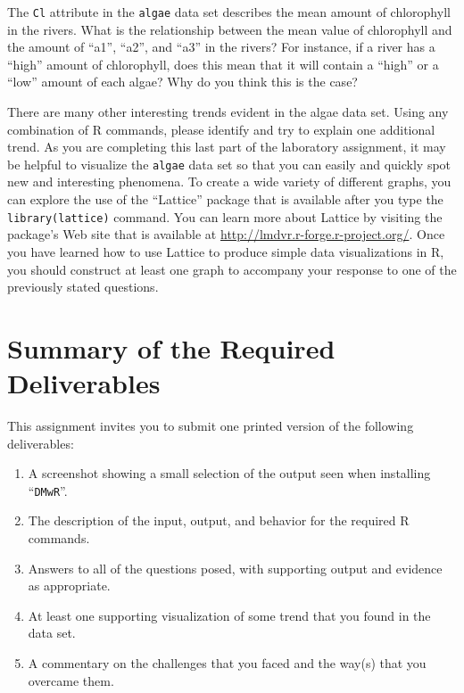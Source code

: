 The {\tt Cl} attribute in the {\tt algae} data set describes the mean amount of chlorophyll in the rivers. What is the
relationship between the mean value of chlorophyll and the amount of ``a1'', ``a2'', and ``a3'' in the rivers?
For instance, if a river has a ``high'' amount of chlorophyll, does this mean that it will contain a ``high'' or a
``low'' amount of each algae? Why do you think this is the case?

There are many other interesting trends evident in the algae data set. Using any combination of R commands, please
identify and try to explain one additional trend. As you are completing this last part of the laboratory assignment, it
may be helpful to visualize the {\tt algae} data set so that you can easily and quickly spot new and interesting
phenomena. To create a wide variety of different graphs, you can explore the use of the ``Lattice'' package that is
available after you type the {\tt library(lattice)} command. You can learn more about Lattice by visiting the package's
Web site that is available at \url{http://lmdvr.r-forge.r-project.org/}. Once you have learned how to use Lattice to
produce simple data visualizations in R, you should construct at least one graph to accompany your response to one of
the previously stated questions.


\section*{Summary of the Required Deliverables}

  This assignment invites you to submit one printed version of the following deliverables:

  \vspace*{-.05in}
  \begin{enumerate}
    \setlength{\itemsep}{0pt}
    \item A screenshot showing a small selection of the output seen when installing ``{\tt DMwR}''.
    \item The description of the input, output, and behavior for the required R commands.
    \item Answers to all of the questions posed, with supporting output and evidence as appropriate. 
    \item At least one supporting visualization of some trend that you found in the data set. 
    \item A commentary on the challenges that you faced and the way(s) that you overcame them.
  \end{enumerate}

